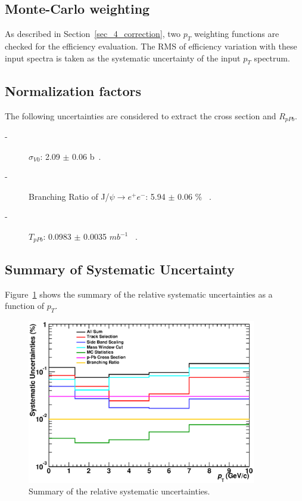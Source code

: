 \subsection{Monte-Carlo weighting}
As described in Section~\ref{sec_4_correction}, two $p_{T}$ weighting functions are checked for the efficiency evaluation. 
The RMS of efficiency variation with these input spectra is taken as the systematic uncertainty of the input $p_{T}$ spectrum.  


\subsection{Normalization factors}
The following uncertainties are considered to extract the cross section and $R_{pPb}$. 
\begin{description}
  \item[-] $\sigma_{V0}$: 2.09 $\pm$ 0.06 b~\cite{bib_v0cross}.
  \item[-] Branching Ratio of J/$\psi\rightarrow e^{+}e^{-}$: 5.94 $\pm$ 0.06 \% ~\cite{bib_pdg}.
  \item[-] $T_{pPb}$: 0.0983 $\pm$ 0.0035 $mb^{-1}$ ~\cite{bib_tppb}.
\end{description}


\subsection{Summary of Systematic Uncertainty}
Figure~\ref{fig_4_syssummary} shows the summary of the relative systematic uncertainties as a function of $p_{T}$. 

\begin{figure}[!h]
  \centering
  \includegraphics[width=10cm]{chap4/figure/Systematics/JpsiSys_INT7_ptdep.eps}
  \caption{Summary of the relative systematic uncertainties.  }
  \label{fig_4_syssummary}
\end{figure}

